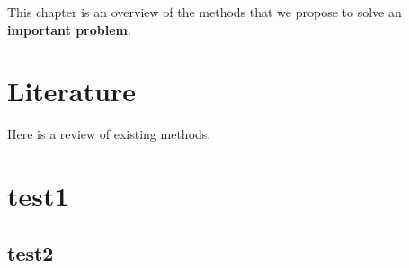 \documentclass[
]{book}
\begin{document}
This chapter is an overview of the methods that we propose to solve an
\textbf{important problem}.

\hypertarget{literature}{%
\chapter{Literature}\label{literature}}

Here is a review of existing methods.

\hypertarget{test1}{%
\chapter{test1}\label{test1}}

\hypertarget{test2}{%
\section{test2}\label{test2}}

\backmatter
\end{document}
